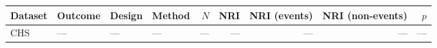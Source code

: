 \begin{table}[ht]
\centering
\footnotesize
\begin{tabular}{ll l l r r r r r}
\toprule
Dataset & Outcome & Design & Method & $N$ & NRI & NRI (events) & NRI (non-events) & $p$ \\
\midrule
CHS & --- & --- & --- & --- & --- & --- & --- & --- \\
\bottomrule
\end{tabular}
\label{tab:14_nri}
\end{table}